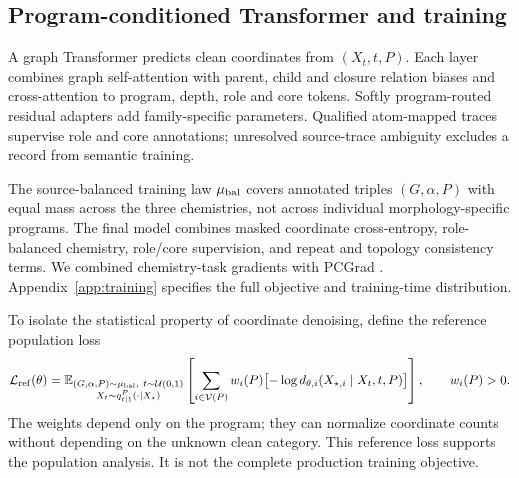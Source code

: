 \documentclass{article}
\theoremstyle{definition}
\begin{document}
\subsection{Program-conditioned Transformer and training}
\label{sec:model-training}

A graph Transformer predicts clean coordinates from $(X_t,t,P)$. Each layer combines graph
self-attention with parent, child and closure relation biases and cross-attention to program,
depth, role and core tokens. Softly program-routed residual adapters add family-specific parameters.
Qualified atom-mapped traces supervise role and core annotations; unresolved source-trace ambiguity
excludes a record from semantic training.

The source-balanced training law $\mu_{\rm bal}$ covers annotated triples $(G,\alpha,P)$ with equal
mass across the three chemistries, not across individual morphology-specific programs. The final
model combines masked coordinate cross-entropy, role-balanced chemistry, role/core supervision,
and repeat and topology consistency terms. We combined chemistry-task gradients with PCGrad
\citep{yu2020gradient}. Appendix~\ref{app:training} specifies the full objective and training-time
distribution.

To isolate the statistical property of coordinate denoising, define the reference population loss
\begin{equation}
 \mathcal L_{\rm ref}(\theta)
 =\mathbb E_{\substack{(G,\alpha,P)\sim\mu_{\rm bal},\ t\sim\mathcal U(0,1)\\
 X_t\sim q_{t\mid1}^P(\cdot\mid X_\star)}}
 \left[\sum_{i\in\mathcal V(P)}w_i(P)
 \bigl[-\log d_{\theta,i}(X_{\star,i}\mid X_t,t,P)\bigr]\right],
 \qquad w_i(P)>0.
 \label{eq:primary-loss}
\end{equation}
The weights depend only on the program; they can normalize coordinate counts without depending
on the unknown clean category. This reference loss supports the population analysis. It is not
the complete production training objective.
\end{document}
